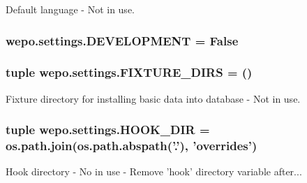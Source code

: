 Default language -\/ Not in use. 

\hypertarget{namespacewepo_1_1settings_ae5c23c654f8de88bf5400722dfe27159}{
\subsubsection[{D\-E\-V\-E\-L\-O\-P\-M\-E\-N\-T}]{\setlength{\rightskip}{0pt plus 5cm}wepo.\-settings.\-D\-E\-V\-E\-L\-O\-P\-M\-E\-N\-T = False}}\label{namespacewepo_1_1settings_ae5c23c654f8de88bf5400722dfe27159}
\hypertarget{namespacewepo_1_1settings_a49bfa96e1114ba66198ffce7c1de2c4a}{
\subsubsection[{F\-I\-X\-T\-U\-R\-E\-\_\-\-D\-I\-R\-S}]{\setlength{\rightskip}{0pt plus 5cm}tuple wepo.\-settings.\-F\-I\-X\-T\-U\-R\-E\-\_\-\-D\-I\-R\-S = ()}}\label{namespacewepo_1_1settings_a49bfa96e1114ba66198ffce7c1de2c4a}


Fixture directory for installing basic data into database -\/ Not in use. 

\hypertarget{namespacewepo_1_1settings_a12c49fe52d22d2119e0d8e8c687f9189}{
\subsubsection[{H\-O\-O\-K\-\_\-\-D\-I\-R}]{\setlength{\rightskip}{0pt plus 5cm}tuple wepo.\-settings.\-H\-O\-O\-K\-\_\-\-D\-I\-R = os.\-path.\-join(os.\-path.\-abspath('.'), 'overrides')}}\label{namespacewepo_1_1settings_a12c49fe52d22d2119e0d8e8c687f9189}


Hook directory -\/ No in use  -\/ Remove 'hook' directory variable after... 

